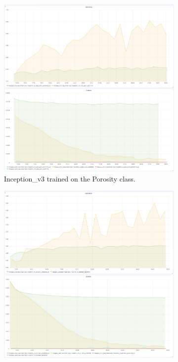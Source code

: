 \begin{figure}
\begin{subfigure}{.6\textwidth}
  \centering
  \includegraphics[width=1\linewidth]{figures/04-go_poro_acc.PNG}
  \caption{Inception\_v3 trained on the Porosity class.}
  \label{fig:googinit_poro}
\end{subfigure}%
\begin{subfigure}{.6\textwidth}
  \centering
  \includegraphics[width=1\linewidth]{figures/04-go_dunham_acc.PNG}

\end{subfigure}
\end{figure}
